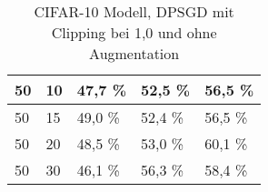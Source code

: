 \begin{table}[!htb]
\begin{tabular}{lllll}
\multicolumn{1}{|l|}{50}                                                     & \multicolumn{1}{l|}{10}                                                                                                       & \multicolumn{1}{l|}{47,7 \%}                                                                                          & \multicolumn{1}{l|}{52,5 \%}                                                                                           & \multicolumn{1}{l|}{56,5 \%}                                                                                           \\ \hline
\multicolumn{1}{|l|}{50}                                                     & \multicolumn{1}{l|}{15}                                                                                                       & \multicolumn{1}{l|}{49,0 \%}                                                                                          & \multicolumn{1}{l|}{52,4 \%}                                                                                           & \multicolumn{1}{l|}{56,5 \%}                                                                                           \\ \hline
\multicolumn{1}{|l|}{50}                                                     & \multicolumn{1}{l|}{20}                                                                                                       & \multicolumn{1}{l|}{48,5 \%}                                                                                          & \multicolumn{1}{l|}{53,0 \%}                                                                                           & \multicolumn{1}{l|}{60,1 \%}                                                                                           \\ \hline
\multicolumn{1}{|l|}{50}                                                     & \multicolumn{1}{l|}{30}                                                                                                       & \multicolumn{1}{l|}{46,1 \%}                                                                                          & \multicolumn{1}{l|}{56,3 \%}                                                                                           & \multicolumn{1}{l|}{58,4 \%}                                                                                           \\ \hline
\end{tabular}
\caption{CIFAR-10 Modell, DPSGD mit Clipping bei 1,0 und ohne Augmentation}
\label{tab:c10_exp2}
\end{table}
